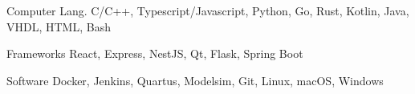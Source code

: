 

\begin{cvskills}

  \cvskill
    {Computer Lang.} %
    {C/C++, Typescript/Javascript, Python, Go, Rust, Kotlin, Java, VHDL, HTML, Bash} %

  \cvskill
    {Frameworks\phantom{aaa}} %
    {React, Express, NestJS, Qt, Flask, Spring Boot} %

  \cvskill
    {Software\phantom{aaaaaa}} %
    {Docker, Jenkins, Quartus, Modelsim, Git, Linux, macOS, Windows} %


\end{cvskills}
